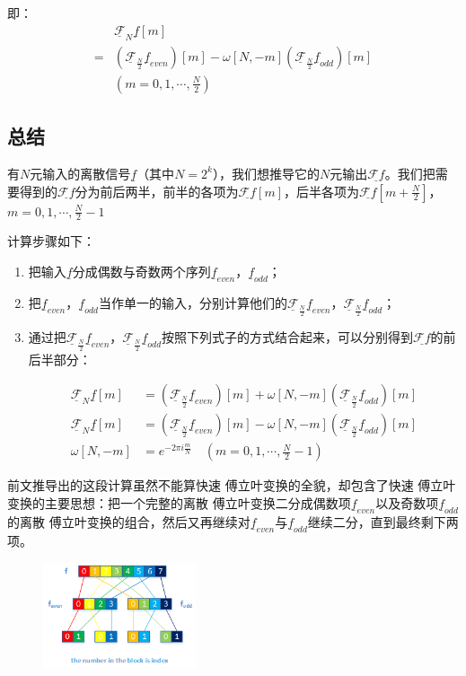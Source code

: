 即：
\begin{align*}
	  & \underline{\mathcal{F}}_N\underline{f}[m]                                                                                                                          \\
	= & \left( \underline{\mathcal{F}}_{\frac{N}{2}}\underline{f}_{even} \right)[m]-\omega[N,-m]\left( \underline{\mathcal{F}}_{\frac{N}{2}}\underline{f}_{odd} \right)[m] \\
	  & (m=0,1, \cdots,\frac{N}{2})
\end{align*}
\subsection{总结}
有$N$元输入的离散信号$\underline{f}$（其中$N=2^k$），我们想推导它的$N$元输出$\underline{\mathcal{F}f}$。我们把需要得到的$\underline{\mathcal{F}f}$分为前后两半，前半的各项为$\underline{\mathcal{F}f}[m]$，后半各项为$\underline{\mathcal{F}f}[m+\frac{N}{2}]$，$m=0,1,\cdots,\frac{N}{2}-1$

计算步骤如下：
\begin{enumerate}
	\item 把输入$\underline{f}$分成偶数与奇数两个序列$\underline{f}_{even}$，$\underline{f}_{odd}$；
	\item 把$\underline{f}_{even}$，$\underline{f}_{odd}$当作单一的输入，分别计算他们的$\underline{\mathcal{F}}_{\frac{N}{2}}\underline{f}_{even}$，$\underline{\mathcal{F}}_{\frac{N}{2}}\underline{f}_{odd}$；
	\item 通过把$\underline{\mathcal{F}}_{\frac{N}{2}}\underline{f}_{even}$，$\underline{\mathcal{F}}_{\frac{N}{2}}\underline{f}_{odd}$按照下列式子的方式结合起来，可以分别得到$\underline{\mathcal{F}f}$的前后半部分：

	      \begin{align*}
		      \underline{\mathcal{F}}_N\underline{f}[m] & = \left( \underline{\mathcal{F}}_{\frac{N}{2}}\underline{f}_{even} \right)[m]+\omega[N,-m]\left( \underline{\mathcal{F}}_{\frac{N}{2}}\underline{f}_{odd} \right)[m] \\
		      \underline{\mathcal{F}}_N\underline{f}[m] & = \left( \underline{\mathcal{F}}_{\frac{N}{2}}\underline{f}_{even} \right)[m]-\omega[N,-m]\left( \underline{\mathcal{F}}_{\frac{N}{2}}\underline{f}_{odd} \right)[m] \\
		      \omega[N,-m]                              & = e^{-2\pi i\frac{m}{N}}\quad (m=0,1,\cdots,\frac{N}{2}-1)
	      \end{align*}
\end{enumerate}


前文推导出的这段计算虽然不能算快速 傅立叶变换的全貌，却包含了快速 傅立叶变换的主要思想：把一个完整的离散 傅立叶变换二分成偶数项$\underline{f}_{even}$以及奇数项$\underline{f}_{odd}$的离散 傅立叶变换的组合，然后又再继续对$\underline{f}_{even}$与$\underline{f}_{odd}$继续二分，直到最终剩下两项。
\begin{figure}[H]
	\centering
	\includegraphics[width=0.4\textwidth]{assets/FFT.png}
\end{figure}